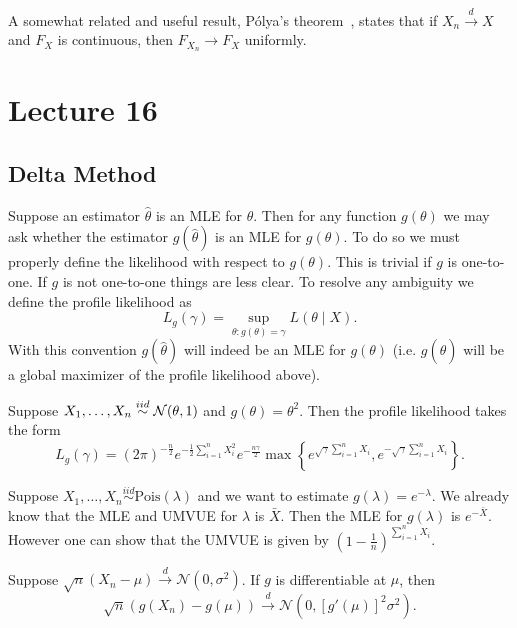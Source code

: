 \begin{remark}
	A somewhat related and useful result, P\'olya's theorem~\cite{Polya1920}, states that if $X_n \overset{d}{\to} X$ and $F_X$ is continuous, then $F_{X_n} \to F_X$ uniformly. 
\end{remark}




\newpage
\section{Lecture 16}

\subsection{Delta Method}

\begin{remark}
	Suppose an estimator $\hat \theta$ is an MLE for $\theta$. Then for any function $g(\theta)$ we may ask whether the estimator $g(\hat{\theta})$ is an MLE for $g(\theta)$. To do so we must properly define the likelihood with respect to $g(\theta)$. This is trivial if $g$ is one-to-one. If $g$ is not one-to-one things are less clear. To resolve any ambiguity we define the profile likelihood as \[
	L_g(\gamma) = \sup_{\theta: g(\theta)=\gamma} L(\theta \mid X).
	\] With this convention $g(\hat{\theta})$ will indeed be an MLE for $g(\theta)$ (i.e. $g(\hat{\theta})$ will be a global maximizer of the profile likelihood above).
\end{remark}

\begin{example}
	Suppose $X_1, \dots, X_n \overset{iid}{\sim} \mathcal N(\theta, 1)$ and $g(\theta) = \theta^2$. Then the profile likelihood takes the form \[
		L_g(\gamma) = (2\pi)^{-\frac{n}{2}} e^{-\frac{1}{2} \sum_{i=1}^n X_i^2} e^{-\frac{n\gamma}{2}} \max\left\{ e^{\sqrt{\gamma} \sum_{i=1}^n X_i}, e^{-\sqrt{\gamma} \sum_{i=1}^n X_i} \right\}.
	\] 
\end{example}

\begin{example} \label{ex:poisson_exp_mle}
	Suppose $X_1, \dots, X_n \overset{iid}{\sim} \text{Pois}(\lambda)$ and we want to estimate $g(\lambda) = e^{-\lambda}$. We already know that the MLE and UMVUE for $\lambda$ is $\bar X$. Then the MLE for $g(\lambda)$ is $e^{-\bar{X}}$. However one can show that the UMVUE is given by $\left(1 - \frac{1}{n}\right)^{\sum_{i=1}^n X_i}$.
\end{example}

\begin{theorem}
	Suppose $\sqrt{n}(X_n - \mu) \overset{d}{\to} \mathcal{N}(0, \sigma^2)$. If $g$ is differentiable at $\mu$, then \[
	\sqrt{n}(g(X_n) - g(\mu)) \overset{d}{\to} \mathcal{N}(0, [g'(\mu)]^2 \sigma^2).
	\]
\end{theorem}

